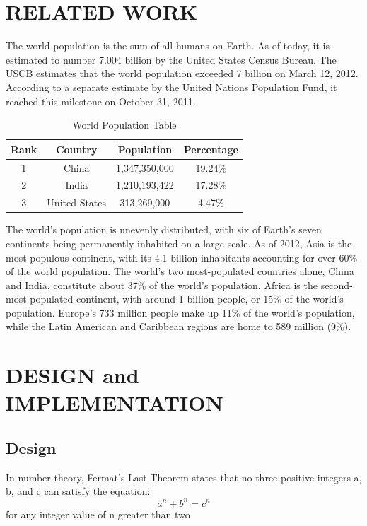 \documentclass{fisatproject}
\begin{document}
\chapter{RELATED WORK}

The world population is the sum of all humans on Earth. As of today, it is estimated to number 7.004 billion by the United States Census Bureau. The USCB estimates that the world population exceeded 7 billion on March 12, 2012. According to a separate estimate by the United Nations Population Fund, it reached this milestone on October 31, 2011.
\begin{table}[h!]
\begin{center}
\begin{tabular}{|c|c|c|c|}
\hline Rank & Country & Population  & Percentage  \\ 
\hline 1 & China & 1,347,350,000 & 19.24\% \\ 
\hline 2 & India & 1,210,193,422  & 17.28\% \\ 
\hline 3 & United States & 313,269,000 & 4.47\% \\ 
\hline 
\end{tabular}
\caption{World Population Table} 
\end{center}
\end{table}
The world's population is unevenly distributed, with six of Earth's seven continents being permanently inhabited on a large scale. As of 2012, Asia is the most populous continent, with its 4.1 billion inhabitants accounting for over 60\% of the world population. The world's two most-populated countries alone, China and India, constitute about 37\% of the world's population. Africa is the second-most-populated continent, with around 1 billion people, or 15\% of the world's population. Europe's 733 million people make up 11\% of the world's population, while the Latin American and Caribbean regions are home to 589 million (9\%).


\chapter{DESIGN and IMPLEMENTATION}

\section{Design}
In number theory, Fermat's Last Theorem states that no three positive integers a, b, and c can satisfy the equation:
$$
a^{n} + b^{n} = c^{n}
$$ 
for any integer value of n greater than two 
\end{document}
